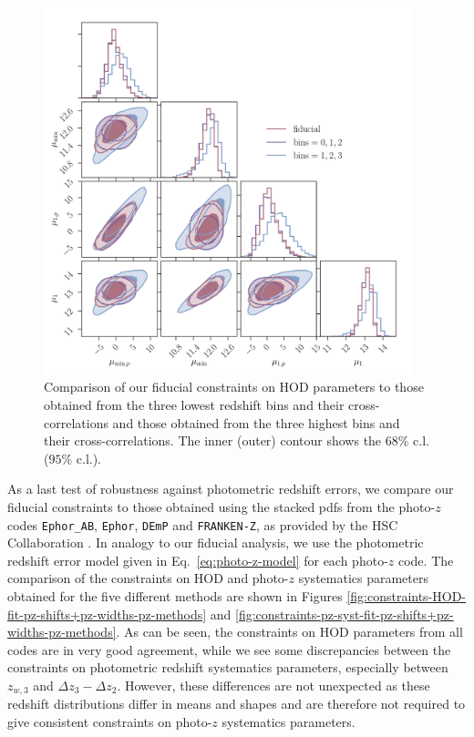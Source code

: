 \documentclass[a4paper,11pt]{article}
\begin{document}
      \begin{figure}
        \begin{center}
          \includegraphics[width=0.95\textwidth]{figures/contours-Mmin-M1_mPk=HOD_fix=alpha-fc-sigmaM_HOD=zevol_fit=pz-shifts-pz-widths+prior=0p2_fit=auto+cross_cosmo=const_HOD-param=zfid_clfit=HOD-zevol_fit-bins=0+1+2+3-vs-fit-bins=0+1+2-vs-fit-bins=1+2+3.pdf}
          \caption{Comparison of our fiducial constraints on HOD parameters to those obtained from the three lowest redshift bins and their cross-correlations and those obtained from the three highest bins and their cross-correlations. The inner (outer) contour shows the $68 \%$ c.l. ($95 \%$ c.l.).}
          \label{fig:constraints-fit-bins=0+1+2+3-vs-fit-bins=0+1+2-vs-fit-bins=1+2+3}
        \end{center}
      \end{figure}

      As a last test of robustness against photometric redshift errors, we compare our fiducial constraints to those obtained using the stacked pdfs from the photo-$z$ codes \texttt{Ephor\_AB}, \texttt{Ephor}, \texttt{DEmP} and \texttt{FRANKEN-Z}, as provided by the HSC Collaboration \cite{2018PASJ...70S...9T}. In analogy to our fiducial analysis, we use the photometric redshift error model given in Eq.~\ref{eq:photo-z-model} for each photo-$z$ code. The comparison of the constraints on HOD and photo-$z$ systematics parameters obtained for the five different methods are shown in Figures \ref{fig:constraints-HOD-fit-pz-shifts+pz-widths-pz-methods} and \ref{fig:constraints-pz-syst-fit-pz-shifts+pz-widths-pz-methods}. As can be seen, the constraints on HOD parameters from all codes are in very good agreement, while we see some discrepancies between the constraints on photometric redshift systematics parameters, especially between $z_{w, 3}$ and $\Delta z_{3} - \Delta z_{2}$. However, these differences are not unexpected as these redshift distributions differ in means and shapes and are therefore not required to give consistent constraints on photo-$z$ systematics parameters. 
\end{document}
